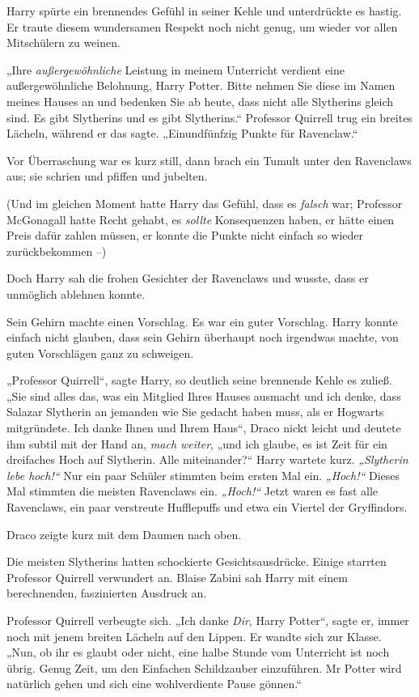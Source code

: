 {Harry spürte ein brennendes Gefühl in seiner Kehle und unterdrückte es hastig. Er traute diesem wundersamen Respekt noch nicht genug, um wieder vor allen Mitschülern zu weinen.

„Ihre \emph{außergewöhnliche} Leistung in meinem Unterricht verdient eine außergewöhnliche Belohnung, Harry Potter. Bitte nehmen Sie diese im Namen meines Hauses an und bedenken Sie ab heute, dass nicht alle Slytherins gleich sind. Es gibt Slytherins und es gibt Slytherins.“ Professor Quirrell trug ein breites Lächeln, während er das sagte. „Einundfünfzig Punkte für Ravenclaw.“

Vor Überraschung war es kurz still, dann brach ein Tumult unter den Ravenclaws aus; sie schrien und pfiffen und jubelten.

(Und im gleichen Moment hatte Harry das Gefühl, dass es \emph{falsch} war; Professor McGonagall hatte Recht gehabt, es \emph{sollte} Konsequenzen haben, er hätte einen Preis dafür zahlen müssen, er konnte die Punkte nicht einfach so wieder zurückbekommen --)

Doch Harry sah die frohen Gesichter der Ravenclaws und wusste, dass er unmöglich ablehnen konnte.

Sein Gehirn machte einen Vorschlag. Es war ein guter Vorschlag. Harry konnte einfach nicht glauben, dass sein Gehirn überhaupt noch irgendwas machte, von guten Vorschlägen ganz zu schweigen.

„Professor Quirrell“, sagte Harry, so deutlich seine brennende Kehle es zuließ. „Sie sind alles das, was ein Mitglied Ihres Hauses ausmacht und ich denke, dass Salazar Slytherin an jemanden wie Sie gedacht haben muss, als er Hogwarts mitgründete. Ich danke Ihnen und Ihrem Haus“, Draco nickt leicht und deutete ihm subtil mit der Hand an, \emph{mach weiter}, „und ich glaube, es ist Zeit für ein dreifaches Hoch auf Slytherin. Alle miteinander?“ Harry wartete kurz. \emph{„Slytherin lebe hoch!“} Nur ein paar Schüler stimmten beim ersten Mal ein. \emph{„Hoch!“} Dieses Mal stimmten die meisten Ravenclaws ein. \emph{„Hoch!“} Jetzt waren es fast alle Ravenclaws, ein paar verstreute Hufflepuffs und etwa ein Viertel der Gryffindors.

Draco zeigte kurz mit dem Daumen nach oben.

Die meisten Slytherins hatten schockierte Gesichtsausdrücke. Einige starrten Professor Quirrell verwundert an. Blaise Zabini sah Harry mit einem berechnenden, faszinierten Ausdruck an.

Professor Quirrell verbeugte sich. „Ich danke \emph{Dir}, Harry Potter“, sagte er, immer noch mit jenem breiten Lächeln auf den Lippen. Er wandte sich zur Klasse. „Nun, ob ihr es glaubt oder nicht, eine halbe Stunde vom Unterricht ist noch übrig. Genug Zeit, um den Einfachen Schildzauber einzuführen. Mr Potter wird natürlich gehen und sich eine wohlverdiente Pause gönnen.“

}
